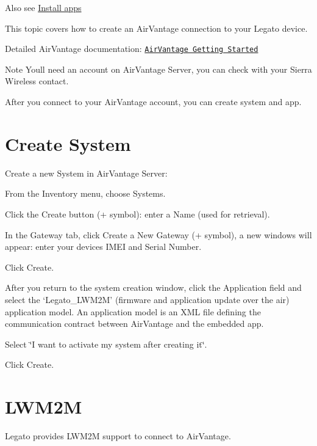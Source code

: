 Also see \hyperlink{appInstallAirVantage}{Install apps}





This topic covers how to create an Air\+Vantage connection to your Legato device.

Detailed Air\+Vantage documentation\+: \href{https://doc.airvantage.net/display/USERGUIDE/Getting+Started}{\tt Air\+Vantage Getting Started}

\begin{DoxyNote}{Note}
You\textquotesingle{}ll need an account on Air\+Vantage Server, you can check with your Sierra Wireless contact.
\end{DoxyNote}
After you connect to your Air\+Vantage account, you can create system and app.\hypertarget{how_to_a_v_connect_connectingAirVantage_createSys}{}\section{Create System}\label{how_to_a_v_connect_connectingAirVantage_createSys}
Create a new System in Air\+Vantage Server\+:
\begin{DoxyItemize}
\item From the {\ttfamily Inventory menu}, choose {\ttfamily Systems}.
\item Click the Create button (+ symbol)\+: enter a Name (used for retrieval).
\item In the {\ttfamily Gateway} tab, click Create a New Gateway (+ symbol), a new windows will appear\+: enter your device\textquotesingle{}s I\+M\+E\+I and Serial Number.
\item Click {\ttfamily Create}.
\item After you return to the system creation window, click the Application field and select the ‘\+Legato\+\_\+\+L\+W\+M2\+M’ (firmware and application update over the air) application model. An application model is an X\+M\+L file defining the communication contract between Air\+Vantage and the embedded app.
\item Select \char`\"{}\+I want to activate my system after creating it\char`\"{}.
\item Click {\ttfamily Create}.
\end{DoxyItemize}\hypertarget{how_to_a_v_connect_connectingAirVantage_lwm2m}{}\section{L\+W\+M2\+M}\label{how_to_a_v_connect_connectingAirVantage_lwm2m}
Legato provides L\+W\+M2\+M support to connect to Air\+Vantage.

